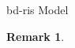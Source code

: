 \documentclass[journal]{IEEEtran}
\newtheorem{remark}{Remark}
\begin{document}
\begin{section}{\gls{bd}-\gls{ris} Model}
\begin{remark}
\begin{itemize}
		\end{itemize}
	\end{remark}







\end{section}
\end{document}
